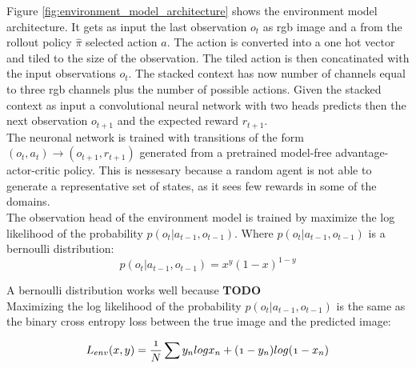 Figure \ref{fig:environment_model_architecture} shows the environment model architecture.
It gets as input the last observation $o_t$ as rgb image and a from the rollout policy $\hat{\pi}$ selected action $a$. The action is converted into a one hot vector and tiled to the size of the observation.
The tiled action is then concatinated with the input observations $o_t$.
The stacked context has now number of channels equal to three rgb channels plus the number of possible actions.
Given the stacked context as input a convolutional neural network with two heads predicts then the next observation $o_{t+1}$ and the expected reward $r_{t+1}$.\\

The neuronal network is trained with transitions of the form $(o_t, a_t) \rightarrow (o_{t+1}, r_{t+1})$ generated from a pretrained model-free advantage-actor-critic policy. This is nessesary because a random agent is not able to generate a representative set of states, as it sees few rewards in some of the domains.\\

 
The observation head of the environment model is trained by maximize the log likelihood of the probability $p(o_t | a_{t-1}, o_{t-1})$.
Where $p(o_t | a_{t-1}, o_{t-1})$ is a bernoulli distribution: 
\begin{equation} 
   p(o_t | a_{t-1}, o_{t-1}) = x^y (1-x)^{1-y} 
\end{equation}

A bernoulli distribution works well because \textbf{TODO}\\

   
Maximizing the log likelihood of the probability $p(o_t | a_{t-1}, o_{t-1})$ is the same as the binary cross entropy loss between the true image and the predicted image:

   
\begin{equation} 
  \mathnormal{ 
  L_{env}(x, y) = \frac{1}{N} \sum y_n log x_n + (1-y_n) log(1- x_n) 
  } 
\end{equation}

